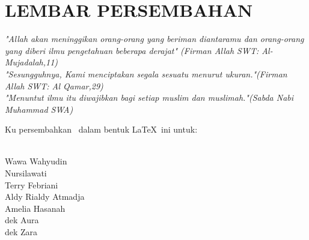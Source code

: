 \chapter*{LEMBAR PERSEMBAHAN} 
\vspace{0.5cm}

\begin{center}
\textit{"Allah akan meninggikan orang-orang yang beriman diantaramu dan orang-orang yang diberi ilmu pengetahuan beberapa derajat" (Firman Allah SWT: Al-Mujadalah,11)}
\vspace{0.7cm}
\\
\textit{"Sesungguhnya, Kami menciptakan segala sesuatu menurut ukuran."(Firman Allah SWT: Al Qamar,29)}
\vspace{0.7cm}
\\
\textit{"Menuntut ilmu itu diwajibkan bagi setiap muslim dan muslimah."(Sabda Nabi Muhammad SWA)}
\vspace{0.7cm}
\\

\end{center}

\begin{flushright}
\vspace{1.5cm}
Ku persembahkan \model\ dalam bentuk \LaTeX\ ini untuk:
\begin{footnotesize}
\\Wawa Wahyudin 
\\Nursilawati
\\Terry Febriani
\\Aldy Rialdy Atmadja
\\Amelia Hasanah 
\\dek Aura
\\dek Zara
\end{footnotesize}
\end{flushright}

